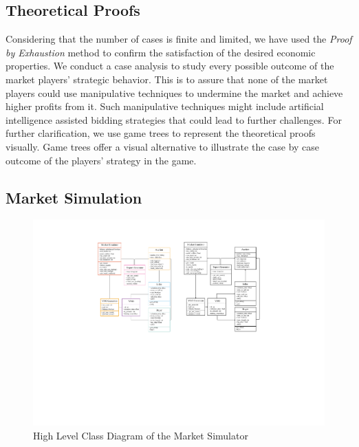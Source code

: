 \subsection{Theoretical Proofs}

Considering that the number of cases is finite and limited, we have used the \textit{Proof by Exhaustion} method to confirm the satisfaction of the desired economic properties. We conduct a case analysis to study every possible outcome of the market players' strategic behavior. This is to assure that none of the market players could use manipulative techniques to undermine the market and achieve higher profits from it. Such manipulative techniques might include artificial intelligence assisted bidding strategies that could lead to further challenges. 
For further clarification, we use game trees to represent the theoretical proofs visually. Game trees offer a visual alternative to illustrate the case by case outcome of the players' strategy in the game. 
\subsection{Market Simulation}
\label{Method:subsec:simul}

\begin{figure}
\centering
\includegraphics[width=0.8\linewidth]{Figures/UML.pdf}
\caption{High Level Class Diagram of the Market Simulator}
\label{sim_UML}
\end{figure}

